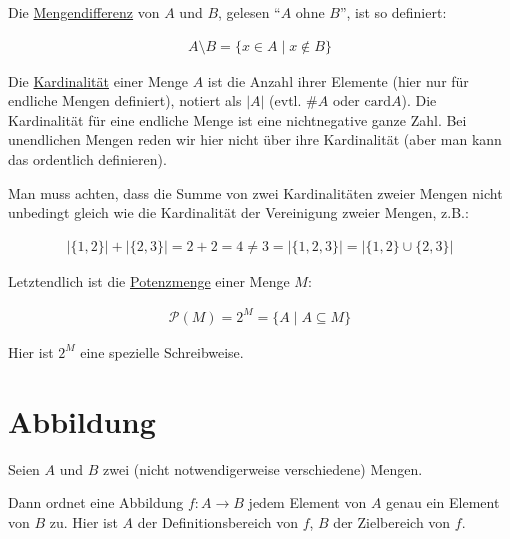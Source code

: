 \documentclass[12pt,a4paper,oneside]{article}
\newcommand{\afz}[1]{\enquote{#1}}
\newcommand{\emptyline}{\hspace*{\fill}}
\begin{document}
            \emptyline

            Die \ul{Mengendifferenz} von $A$ und $B$, gelesen \afz{$A$ ohne $B$}, ist so definiert:

            \vspace{-1em}
            \begin{align*}
                A \setminus B = \{x \in A \;|\; x \notin B\}
            \end{align*}

            Die \ul{Kardinalität} einer Menge $A$ ist die Anzahl ihrer Elemente (hier nur für endliche Mengen definiert),
            notiert als $|A|$ (evtl. $\#A$ oder $\text{card}A$).
            Die Kardinalität für eine endliche Menge ist eine nichtnegative ganze Zahl.
            Bei unendlichen Mengen reden wir hier nicht über ihre Kardinalität (aber man kann das ordentlich definieren).

            \emptyline

            Man muss achten, dass die Summe von zwei Kardinalitäten zweier Mengen nicht unbedingt gleich wie
            die Kardinalität der Vereinigung zweier Mengen, z.B.:

            \vspace{-1em}
            \begin{align*}
                |\{1, 2\}| + |\{2, 3\}| = 2 + 2 = 4 \neq 3 = |\{1, 2, 3\}| = |\{1, 2\} \cup \{2, 3\}|
            \end{align*}

            Letztendlich ist die \ul{Potenzmenge} einer Menge $M$:

            \vspace{-1em}
            \begin{align*}
                \mathcal{P}(M) = 2^M = \{A \;|\; A \subseteq M\}
            \end{align*}

            Hier ist $2^M$ eine spezielle Schreibweise. 

    \newpage

    \section{Abbildung}

        Seien $A$ und $B$ zwei (nicht notwendigerweise verschiedene) Mengen.

        \emptyline

        Dann ordnet eine Abbildung $f: A \to B$ jedem Element von $A$ genau ein Element von $B$ zu.
        Hier ist $A$ der Definitionsbereich von $f$, $B$ der Zielbereich von $f$.
\end{document}
